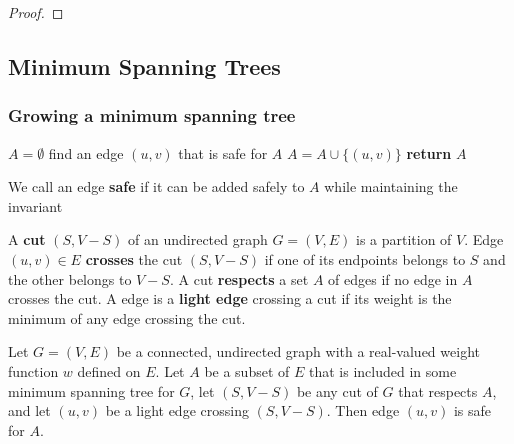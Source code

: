 \documentclass[11pt]{article}
\begin{document}
\begin{proof}

\end{proof}
\subsection{Minimum Spanning Trees}
\label{sec:org04b6b1f}
\subsubsection{Growing a minimum spanning tree}
\label{sec:org4fe7a6f}
\begin{algorithmic}[1]
\State \(A=\emptyset\)
    \State find an edge \((u,v)\) that is safe for \(A\)
    \State \(A=A\cup\{(u,v)\}\)
\EndWhile
\State \textbf{return }\(A\)
\EndProcedure
\end{algorithmic}
We call an edge \textbf{safe} if it can be added safely to \(A\) while maintaining the invariant

A \textbf{cut} \((S,V-S)\) of an undirected graph \(G=(V,E)\) is a partition of \(V\). Edge \((u,v)\in E\)
\textbf{crosses} the cut \((S,V-S)\) if one of its endpoints belongs to \(S\) and the other belongs
to \(V-S\). A cut \textbf{respects} a set \(A\) of edges if no edge in \(A\) crosses the cut. A edge is a
\textbf{light edge} crossing a cut if its weight is the minimum of any edge crossing the cut.

\begin{theorem}[]
Let \(G=(V,E)\) be a connected, undirected graph with a real-valued weight function \(w\)
defined on \(E\). Let \(A\) be a subset of \(E\) that is included in some minimum spanning tree
for \(G\), let \((S,V-S)\) be any cut of \(G\) that respects \(A\), and let \((u,v)\) be a
light edge crossing \((S,V-S)\). Then edge \((u,v)\) is safe for \(A\).
\end{theorem}
\end{document}
